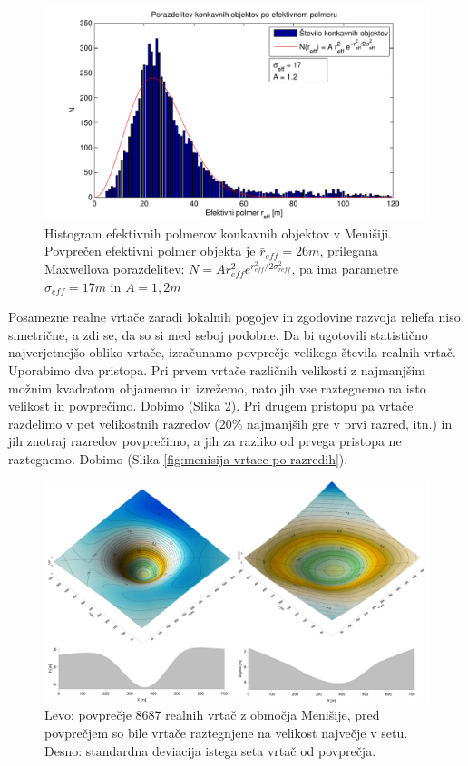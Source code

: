 \documentclass[a4paper, twoside, 12pt]{book}
\begin{document}
  \begin{figure}[h!]
    \begin{center}
      \includegraphics[width=12cm]{slike/menisija-polmeri-hist-maxwell}
    \end{center}
    \caption{Histogram efektivnih polmerov konkavnih objektov v Menišiji. Povprečen efektivni polmer objekta je $\bar r_{eff}=26m$, prilegana Maxwellova porazdelitev: $ N = A r_{eff}^2 e^{r_{eff}^2/2 \sigma_{reff}^2}$, pa ima parametre $\sigma_{eff}=17m$ in $A=1,2m$}
    \label{fig:menisija-polmeri-hist}
  \end{figure}

  Posamezne realne vrtače zaradi lokalnih pogojev in zgodovine razvoja reliefa niso simetrične, a zdi se, da so si med seboj podobne. Da bi ugotovili statistično najverjetnejšo obliko vrtače, izračunamo povprečje velikega števila realnih vrtač. Uporabimo dva pristopa. Pri prvem vrtače različnih velikosti z najmanjšim možnim kvadratom objamemo in izrežemo, nato jih vse raztegnemo na isto velikost in povprečimo. Dobimo (Slika \ref{fig:menisija-vrtaca}). Pri drugem pristopu pa vrtače razdelimo v pet velikostnih razredov (20\% najmanjših gre v prvi razred, itn.) in jih znotraj razredov povprečimo, a jih za razliko od prvega pristopa ne raztegnemo. Dobimo (Slika \ref{fig:menisija-vrtace-po-razredih}).

  \begin{figure}[h!]
    \begin{center}
      \includegraphics[width=14cm]{slike/menisija-vrtaca-sigma}
    \end{center}
    \caption{Levo: povprečje 8687 realnih vrtač z območja Menišije, pred povprečjem so bile vrtače raztegnjene na velikost največje v setu. Desno: standardna deviacija istega seta vrtač od povprečja.}
    \label{fig:menisija-vrtaca}
  \end{figure}
\end{document}
